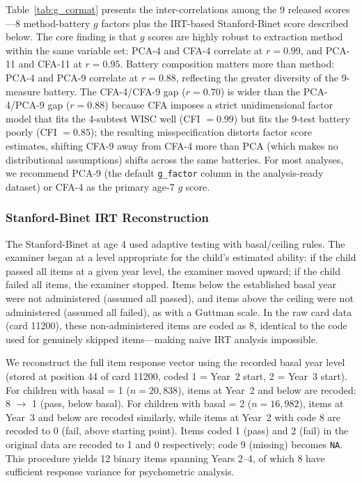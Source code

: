 \documentclass[12pt]{article}
\begin{document}
Table~\ref{tab:g_cormat} presents the inter-correlations among the 9 released scores---8 method-battery $g$ factors plus the IRT-based Stanford-Binet score described below. The core finding is that $g$ scores are highly robust to extraction method within the same variable set: PCA-4 and CFA-4 correlate at $r = 0.99$, and PCA-11 and CFA-11 at $r = 0.95$. Battery composition matters more than method: PCA-4 and PCA-9 correlate at $r = 0.88$, reflecting the greater diversity of the 9-measure battery. The CFA-4/CFA-9 gap ($r = 0.70$) is wider than the PCA-4/PCA-9 gap ($r = 0.88$) because CFA imposes a strict unidimensional factor model that fits the 4-subtest WISC well (CFI $= 0.99$) but fits the 9-test battery poorly (CFI $= 0.85$); the resulting misspecification distorts factor score estimates, shifting CFA-9 away from CFA-4 more than PCA (which makes no distributional assumptions) shifts across the same batteries. For most analyses, we recommend PCA-9 (the default \texttt{g\_factor} column in the analysis-ready dataset) or CFA-4 as the primary age-7 $g$ score.

\subsubsection{Stanford-Binet IRT Reconstruction}

The Stanford-Binet at age 4 used adaptive testing with basal/ceiling rules. The examiner began at a level appropriate for the child's estimated ability: if the child passed all items at a given year level, the examiner moved upward; if the child failed all items, the examiner stopped. Items below the established basal year were not administered (assumed all passed), and items above the ceiling were not administered (assumed all failed), as with a Guttman scale. In the raw card data (card 11200), these non-administered items are coded as 8, identical to the code used for genuinely skipped items---making naive IRT analysis impossible.

We reconstruct the full item response vector using the recorded basal year level (stored at position 44 of card 11200, coded 1 = Year~2 start, 2 = Year~3 start). For children with basal = 1 ($n = 20{,}838$), items at Year~2 and below are recoded: 8 $\to$ 1 (pass, below basal). For children with basal = 2 ($n = 16{,}982$), items at Year~3 and below are recoded similarly, while items at Year~2 with code 8 are recoded to 0 (fail, above starting point). Items coded 1 (pass) and 2 (fail) in the original data are recoded to 1 and 0 respectively; code 9 (missing) becomes \texttt{NA}. This procedure yields 12 binary items spanning Years 2--4, of which 8 have sufficient response variance for psychometric analysis.
\end{document}
